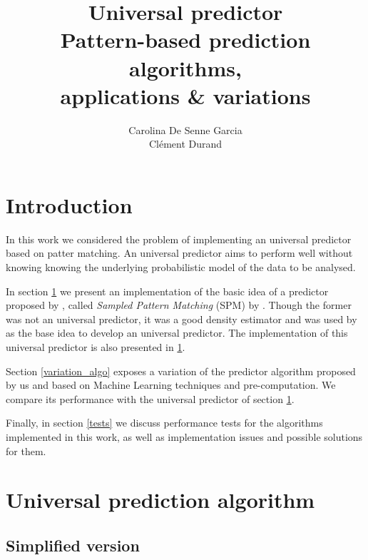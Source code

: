 \documentclass[a4paper,12pt]{article}
\title{%
  Universal predictor\\\small%
  Pattern-based prediction algorithms,\\%
  applications \& variations%
}
\author{%
  Carolina De Senne Garcia\\%
  Clément Durand%
}
\begin{document}
\maketitle

\vspace*{\fill}

\begin{abstract}
  \lipsum[1-2]
\end{abstract}

\vspace*{\fill}

\clearpage

\tableofcontents

\clearpage

\section*{Introduction}

In this work we considered the problem of implementing an universal predictor based on patter matching. An universal predictor aims to perform well without knowing knowing the underlying probabilistic model of the data to be analysed.

In section \ref{paper_algos} we present an implementation of the basic idea of a predictor proposed by \citeauthor{basic_algo} \cite{basic_algo}, called \textit{Sampled Pattern Matching} (SPM) by \citeauthor{paper} \cite{paper}. Though the former was not an universal predictor, it was a good density estimator and was used by \citeauthor{paper} \cite{paper} as the base idea to develop an universal predictor. The implementation of this universal predictor is also presented in \ref{paper_algos}.

Section \ref{variation_algo} exposes a variation of the predictor algorithm proposed by us and based on Machine Learning techniques and pre-computation. We compare its performance with the universal predictor of section \ref{paper_algos}.

Finally, in section \ref{tests} we discuss performance tests for the algorithms implemented in this work, as well as implementation issues and possible solutions for them.

\section{Universal prediction algorithm}\label{paper_algos}

  
  \subsection{Simplified version}
\end{document}
